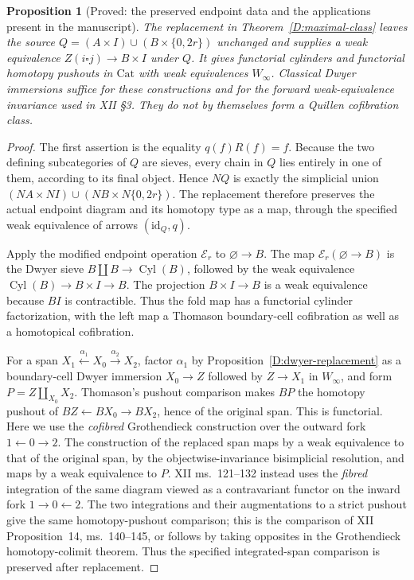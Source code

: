 \documentclass[11pt,a4paper]{article}
\newtheorem{proposition}[theorem]{Proposition}
\theoremstyle{definition}
\theoremstyle{remark}
\begin{document}
\begin{proposition}[Proved: the preserved endpoint data and the applications present in the manuscript]\label{D:applications}
The replacement in Theorem~\ref{D:maximal-class} leaves the source
$Q=(A\times I)\cup(B\times\{0,2r\})$ unchanged and supplies a weak equivalence $Z(i\square j)\to B\times I$ under $Q$. It gives functorial cylinders and functorial homotopy pushouts in $\mathrm{Cat}$ with weak equivalences $W_\infty$. Classical Dwyer immersions suffice for these constructions and for the forward weak-equivalence invariance used in XII \S3. They do not by themselves form a Quillen cofibration class.
\end{proposition}
\begin{proof}
The first assertion is the equality $q(f)R(f)=f$. Because the two defining subcategories of $Q$ are sieves, every chain in $Q$ lies entirely in one of them, according to its final object. Hence $NQ$ is exactly the simplicial union $(NA\times NI)\cup(NB\times N\{0,2r\})$. The replacement therefore preserves the actual endpoint diagram and its homotopy type as a map, through the specified weak equivalence of arrows $(\mathrm{id}_Q,q)$.

Apply the modified endpoint operation $\mathcal E_r$ to $\varnothing\to B$. The map $\mathcal E_r(\varnothing\to B)$ is the Dwyer sieve $B\amalg B\to\operatorname{Cyl}(B)$, followed by the weak equivalence $\operatorname{Cyl}(B)\to B\times I\to B$. The projection $B\times I\to B$ is a weak equivalence because $BI$ is contractible. Thus the fold map has a functorial cylinder factorization, with the left map a Thomason boundary-cell cofibration as well as a homotopical cofibration.

For a span $X_1\xleftarrow{\alpha_1}X_0\xrightarrow{\alpha_2}X_2$, factor $\alpha_1$ by Proposition~\ref{D:dwyer-replacement} as a boundary-cell Dwyer immersion $X_0\to Z$ followed by $Z\to X_1$ in $W_\infty$, and form $P=Z\amalg_{X_0}X_2$. Thomason's pushout comparison makes $BP$ the homotopy pushout of $BZ\leftarrow BX_0\to BX_2$, hence of the original span. This is functorial. Here we use the \emph{cofibred} Grothendieck construction over the outward fork $1\leftarrow0\to2$. The construction of the replaced span maps by a weak equivalence to that of the original span, by the objectwise-invariance bisimplicial resolution, and maps by a weak equivalence to $P$. XII ms.~121--132 instead uses the \emph{fibred} integration of the same diagram viewed as a contravariant functor on the inward fork $1\to0\leftarrow2$. The two integrations and their augmentations to a strict pushout give the same homotopy-pushout comparison; this is the comparison of XII Proposition~14, ms.~140--145, or follows by taking opposites in the Grothendieck homotopy-colimit theorem. Thus the specified integrated-span comparison is preserved after replacement.


\end{proof}
\end{document}
